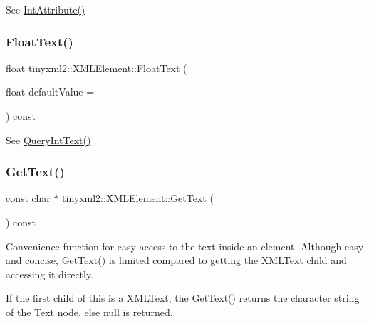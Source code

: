 See \hyperlink{classtinyxml2_1_1_x_m_l_element_a95a89b13bb14a2d4655e2b5b406c00d4}{Int\+Attribute()} 

\mbox{\label{classtinyxml2_1_1_x_m_l_element_a45444eb21f99ca46101545992dc2e927}} 
\subsubsection{\texorpdfstring{Float\+Text()}{FloatText()}}
{\footnotesize\ttfamily float tinyxml2\+::\+X\+M\+L\+Element\+::\+Float\+Text (\begin{DoxyParamCaption}\item[{float}]{default\+Value = {} }\end{DoxyParamCaption}) const}



See \hyperlink{classtinyxml2_1_1_x_m_l_element_a926357996bef633cb736e1a558419632}{Query\+Int\+Text()} 

\mbox{\label{classtinyxml2_1_1_x_m_l_element_a0fa5bea0a4daf3ddd503dcabb823eba6}} 
\subsubsection{\texorpdfstring{Get\+Text()}{GetText()}}
{\footnotesize\ttfamily const char $\ast$ tinyxml2\+::\+X\+M\+L\+Element\+::\+Get\+Text (\begin{DoxyParamCaption}{ }\end{DoxyParamCaption}) const}

Convenience function for easy access to the text inside an element. Although easy and concise, \hyperlink{classtinyxml2_1_1_x_m_l_element_a0fa5bea0a4daf3ddd503dcabb823eba6}{Get\+Text()} is limited compared to getting the \hyperlink{classtinyxml2_1_1_x_m_l_text}{X\+M\+L\+Text} child and accessing it directly.

If the first child of \textquotesingle{}this\textquotesingle{} is a \hyperlink{classtinyxml2_1_1_x_m_l_text}{X\+M\+L\+Text}, the \hyperlink{classtinyxml2_1_1_x_m_l_element_a0fa5bea0a4daf3ddd503dcabb823eba6}{Get\+Text()} returns the character string of the Text node, else null is returned.

